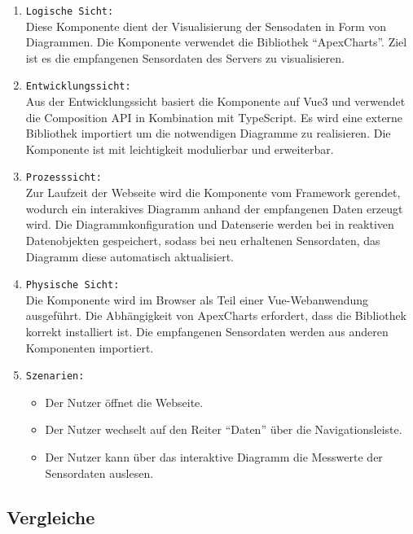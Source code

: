\begin{enumerate}
  \item \texttt{Logische Sicht:} \\
  Diese Komponente dient der Visualisierung der Sensodaten in Form von Diagrammen.
  Die Komponente verwendet die Bibliothek ``ApexCharts''.
  Ziel ist es die empfangenen Sensordaten des Servers zu visualisieren. 
  \item \texttt{Entwicklungssicht:} \\
  Aus der Entwicklungssicht basiert die Komponente auf Vue3 und verwendet die Composition API
  in Kombination mit TypeScript.
  Es wird eine externe Bibliothek importiert um die notwendigen Diagramme zu realisieren.
  Die Komponente ist mit leichtigkeit modulierbar und erweiterbar. 
  \item \texttt{Prozesssicht:} \\
  Zur Laufzeit der Webseite wird die Komponente vom Framework gerendet, 
  wodurch ein interakives Diagramm anhand der empfangenen Daten erzeugt wird.
  Die Diagrammkonfiguration und Datenserie werden bei in reaktiven Datenobjekten gespeichert,
  sodass bei neu erhaltenen Sensordaten, das Diagramm diese automatisch aktualisiert. 
  \item \texttt{Physische Sicht:} \\
  Die Komponente wird im Browser als Teil einer Vue-Webanwendung ausgeführt.
  Die Abhängigkeit von ApexCharts erfordert, dass die Bibliothek korrekt installiert ist.
  Die empfangenen Sensordaten werden aus anderen Komponenten importiert.
  \item \texttt{Szenarien:} \\
    \begin{itemize}
      \renewcommand{\labelitemi}{$\Rightarrow$}
    \item Der Nutzer öffnet die Webseite.
    \item Der Nutzer wechselt auf den Reiter ``Daten'' über die Navigationsleiste.
    \item Der Nutzer kann über das interaktive Diagramm die Messwerte der Sensordaten auslesen. 
    \end{itemize}
\end{enumerate}

\subsection{Vergleiche}
\label{subsec:frontend_Vergleich}

